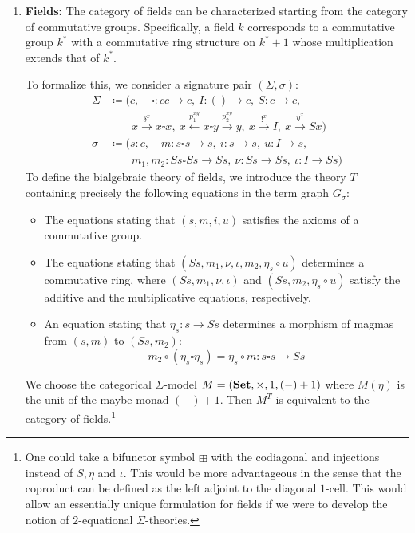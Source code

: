 \begin{examples}
\begin{enumerate}
\item \textbf{Fields:}
    The category of fields can be characterized starting from the category of commutative groups. Specifically, a field $k$ corresponds to a commutative group $k^*$ with a commutative ring structure on $k^*+1$ whose multiplication extends that of $k^*$.

    To formalize this, we consider a signature pair $(\Sigma, \sigma)$:
    \begin{align*}
    \Sigma
    &\coloneqq (c,\quad \square\colon cc\to c,\ I\colon ()\to c,\ S\colon c\to c,\\
    &\quad\quad x\xrightarrow{\delta^x}x\square x, \ x\xleftarrow{p_1^{xy}}x\square y\xrightarrow{p_2^{xy}}y,\ x\xrightarrow{!^x}I,\ x\xrightarrow{\eta^x}Sx)\\
    \sigma
    &\coloneqq (s \colon c,\quad m\colon s\square s\to s,\ i\colon s\to s,\ u\colon I\to s,\\
    &\quad\quad m_1,m_2\colon Ss\square Ss\to Ss,\ \nu\colon Ss\to Ss,\ \iota\colon I\to Ss)
    \end{align*}
    To define the bialgebraic theory of fields, we introduce the theory $T$ containing precisely the following equations in the term graph $G_\sigma$:
    \begin{itemize}
        \item The equations stating that $(s, m, i, u)$ satisfies the axioms of a commutative group.
        \item The equations stating that $(Ss, m_1, \nu, \iota, m_2, \eta_s \circ u)$ determines a commutative ring, where $(Ss, m_1, \nu, \iota)$ and $(Ss, m_2, \eta_s \circ u)$ satisfy the additive and the multiplicative equations, respectively.
        \item An equation stating that $\eta_s \colon s \to Ss$ determines a morphism of magmas from $(s,m)$ to $(Ss,m_2)$:
        \[
        m_2 \circ (\eta_s \square \eta_s) = \eta_s \circ m \colon s \square s \to Ss
        \]
    \end{itemize}
    We choose the categorical $\Sigma$-model $M = (\mathbf{Set}, \times, 1, (-)+1)$ where $M(\eta)$ is the unit of the maybe monad $(-)+1$. Then $M^T$ is equivalent to the category of fields.\footnote{One could take a bifunctor symbol $\boxplus$ with the codiagonal and injections instead of $S, \eta$ and $\iota$. This would be more advantageous in the sense that the coproduct can be defined as the left adjoint to the diagonal $1$-cell. This would allow an essentially unique formulation for fields if we were to develop the notion of $2$-equational $\Sigma$-theories.}


\end{enumerate}
\end{examples}

